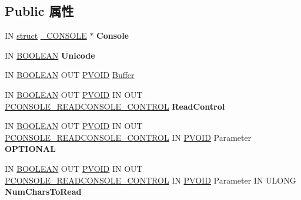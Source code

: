 \subsection*{Public 属性}
\begin{DoxyCompactItemize}
\item 
\mbox{\label{struct___t_e_r_m_i_n_a_l___v_t_b_l_a3fd11e07a8537ec8114cec3cab27a53f}} 
IN \hyperlink{interfacestruct}{struct} \hyperlink{struct___c_o_n_s_o_l_e}{\+\_\+\+C\+O\+N\+S\+O\+LE} $\ast$ {\bfseries Console}
\item 
\mbox{\label{struct___t_e_r_m_i_n_a_l___v_t_b_l_ad85b89d0043e7d8e9104e2099069fbee}} 
IN \hyperlink{_processor_bind_8h_a112e3146cb38b6ee95e64d85842e380a}{B\+O\+O\+L\+E\+AN} {\bfseries Unicode}
\item 
IN \hyperlink{_processor_bind_8h_a112e3146cb38b6ee95e64d85842e380a}{B\+O\+O\+L\+E\+AN} O\+UT \hyperlink{interfacevoid}{P\+V\+O\+ID} \hyperlink{struct___t_e_r_m_i_n_a_l___v_t_b_l_ab5f8da45c8c2ed9774f5a5ec02a308f0}{Buffer}
\item 
\mbox{\label{struct___t_e_r_m_i_n_a_l___v_t_b_l_a1b0b557739776f2766d2b2791828e25a}} 
IN \hyperlink{_processor_bind_8h_a112e3146cb38b6ee95e64d85842e380a}{B\+O\+O\+L\+E\+AN} O\+UT \hyperlink{interfacevoid}{P\+V\+O\+ID} IN O\+UT \hyperlink{struct___c_o_n_s_o_l_e___r_e_a_d_c_o_n_s_o_l_e___c_o_n_t_r_o_l}{P\+C\+O\+N\+S\+O\+L\+E\+\_\+\+R\+E\+A\+D\+C\+O\+N\+S\+O\+L\+E\+\_\+\+C\+O\+N\+T\+R\+OL} {\bfseries Read\+Control}
\item 
\mbox{\label{struct___t_e_r_m_i_n_a_l___v_t_b_l_a1b458e77dcd18ec60cdc0cbf311a894c}} 
IN \hyperlink{_processor_bind_8h_a112e3146cb38b6ee95e64d85842e380a}{B\+O\+O\+L\+E\+AN} O\+UT \hyperlink{interfacevoid}{P\+V\+O\+ID} IN O\+UT \hyperlink{struct___c_o_n_s_o_l_e___r_e_a_d_c_o_n_s_o_l_e___c_o_n_t_r_o_l}{P\+C\+O\+N\+S\+O\+L\+E\+\_\+\+R\+E\+A\+D\+C\+O\+N\+S\+O\+L\+E\+\_\+\+C\+O\+N\+T\+R\+OL} IN \hyperlink{interfacevoid}{P\+V\+O\+ID} Parameter {\bfseries O\+P\+T\+I\+O\+N\+AL}
\item 
\mbox{\label{struct___t_e_r_m_i_n_a_l___v_t_b_l_ae9a09fe1a19014c1001a8b5f860d5434}} 
IN \hyperlink{_processor_bind_8h_a112e3146cb38b6ee95e64d85842e380a}{B\+O\+O\+L\+E\+AN} O\+UT \hyperlink{interfacevoid}{P\+V\+O\+ID} IN O\+UT \hyperlink{struct___c_o_n_s_o_l_e___r_e_a_d_c_o_n_s_o_l_e___c_o_n_t_r_o_l}{P\+C\+O\+N\+S\+O\+L\+E\+\_\+\+R\+E\+A\+D\+C\+O\+N\+S\+O\+L\+E\+\_\+\+C\+O\+N\+T\+R\+OL} IN \hyperlink{interfacevoid}{P\+V\+O\+ID} Parameter IN U\+L\+O\+NG {\bfseries Num\+Chars\+To\+Read}

\end{DoxyCompactItemize}
